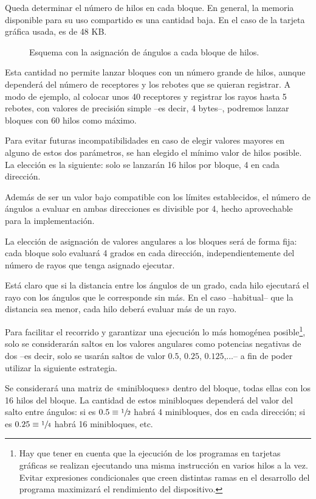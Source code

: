 Queda determinar el número de hilos en cada bloque.
En general, la memoria disponible para su uso compartido es una cantidad baja.
En el caso de la tarjeta gráfica usada, es de 48 KB\cite{Nvidia}.

\begin{figure}[H]
    \centering
    
    \caption{Esquema con la asignación de ángulos a cada bloque de hilos.}
    \label{fig:CUDA_angulos}
\end{figure}

Esta cantidad no permite lanzar bloques con un número grande de hilos, aunque dependerá del número de receptores y los rebotes que se quieran registrar.
A modo de ejemplo, al colocar unos 40 receptores y registrar los rayos hasta 5 rebotes, con valores de precisión simple --es decir, 4 bytes--, podremos lanzar bloques con 60 hilos como máximo.

Para evitar futuras incompatibilidades en caso de elegir valores mayores en alguno de estos dos parámetros, se han elegido el mínimo valor de hilos posible.
La elección es la siguiente: solo se lanzarán 16 hilos por bloque, 4 en cada dirección.

Además de ser un valor bajo compatible con los límites establecidos, el número de ángulos a evaluar en ambas direcciones es divisible por 4, hecho aprovechable para la implementación.

La elección de asignación de valores angulares a los bloques será de forma fija: cada bloque solo evaluará 4 grados en cada dirección, independientemente del número de rayos que tenga asignado ejecutar.

Está claro que si la distancia entre los ángulos de un grado, cada hilo ejecutará el rayo con los ángulos que le corresponde sin más.
En el caso --habitual-- que la distancia sea menor, cada hilo deberá evaluar más de un rayo.

Para facilitar el recorrido y garantizar una ejecución lo más homogénea posible\footnote{Hay que tener en cuenta que la ejecución de los programas en tarjetas gráficas se realizan ejecutando una misma instrucción en varios hilos a la vez. Evitar expresiones condicionales que creen distintas ramas en el desarrollo del programa maximizará el rendimiento del dispositivo.}, solo se considerarán saltos en los valores angulares como potencias negativas de dos --es decir, solo se usarán saltos de valor $0.5$, $0.25$, $0.125$,...-- a fin de poder utilizar la siguiente estrategia.

Se considerará una matriz de «minibloques» dentro del bloque, todas ellas con los 16 hilos del bloque.
La cantidad de estos minibloques dependerá del valor del salto entre ángulos: si es $0.5 \equiv \sfrac{1}{2}$ habrá 4 minibloques, dos en cada dirección; si es $0.25 \equiv \sfrac{1}{4}$ habrá 16 minibloques, etc.

